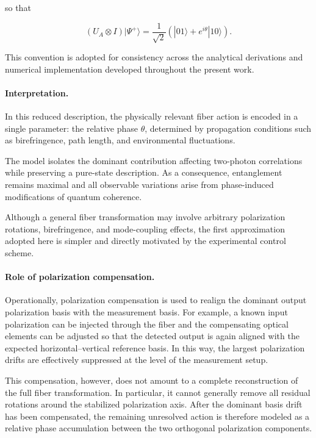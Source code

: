so that

\begin{equation}
(U_A \otimes I)|\Psi^+\rangle
=
\frac{1}{\sqrt{2}}
\left(
|01\rangle
+
e^{i\theta}|10\rangle
\right).
\label{eq:phase_convention_state}
\end{equation}

This convention is adopted for consistency across the analytical derivations and numerical implementation developed throughout the present work.

\medskip

\paragraph{Interpretation.}

In this reduced description, the physically relevant fiber action is encoded in a single parameter: the relative phase \( \theta \), determined by propagation conditions such as birefringence, path length, and environmental fluctuations.

The model isolates the dominant contribution affecting two-photon correlations while preserving a pure-state description. As a consequence, entanglement remains maximal and all observable variations arise from phase-induced modifications of quantum coherence.

\medskip

Although a general fiber transformation may involve arbitrary polarization rotations, birefringence, and mode-coupling effects, the first approximation adopted here is simpler and directly motivated by the experimental control scheme.

\medskip

\paragraph{Role of polarization compensation.}

Operationally, polarization compensation is used to realign the dominant output polarization basis with the measurement basis. For example, a known input polarization can be injected through the fiber and the compensating optical elements can be adjusted so that the detected output is again aligned with the expected horizontal--vertical reference basis. In this way, the largest polarization drifts are effectively suppressed at the level of the measurement setup.

\medskip

This compensation, however, does not amount to a complete reconstruction of the full fiber transformation. In particular, it cannot generally remove all residual rotations around the stabilized polarization axis. After the dominant basis drift has been compensated, the remaining unresolved action is therefore modeled as a relative phase accumulation between the two orthogonal polarization components.

